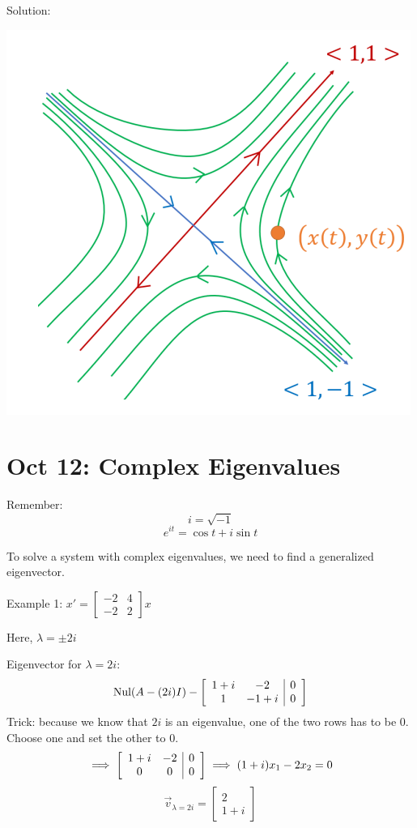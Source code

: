 \documentclass[12pt]{article}
\begin{document}
Solution:

\includegraphics{Images/phase portrait.png}

\section{Oct 12: Complex Eigenvalues}
Remember:
\[i = \sqrt{-1}\]
\[e^{it} = \cos t + i \sin t\]

To solve a system with complex eigenvalues, we need to find a generalized eigenvector. 

Example 1: $x' = \begin{bmatrix}
    -2 & 4\\
    -2 & 2
\end{bmatrix} x$

Here, $\lambda = \pm 2i$

Eigenvector for $\lambda = 2i$:
\[\text{Nul}(A- (2i)I) - \left[\begin{array}{c c | c}
    1 + i & -2 & 0\\
    1 & -1 + i & 0
\end{array}\right]\]
Trick: because we know that $2i$ is an eigenvalue, one of the two rows has to be 0. Choose one and set the other to 0. 
\[\implies \left[\begin{array}{c c | c}
    1 + i & -2 & 0\\
    0 & 0 & 0
\end{array}\right] \implies (1+ i)x_1 -2x_2 = 0\]
\[\vec{v}_{\lambda = 2i} = \begin{bmatrix}
    2\\
    1 + i
\end{bmatrix}\]
\end{document}
